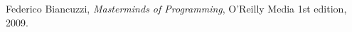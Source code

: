 \begin{thebibliography}{99}

 	Federico Biancuzzi,
  	\textit{Masterminds of Programming},
	O'Reilly Media
  	1st edition,
	2009.

\end{thebibliography}
